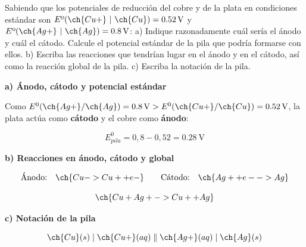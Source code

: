 \begin{exerciseEVAU}
    Sabiendo que los potenciales de reducción del cobre y de la plata en condiciones estándar son \( E\text{º}(\ch{Cu+}\ | \ \ch{Cu}) = \SI{+0.52}{\volt} \)  y \( E\text{º}(\ch{Ag+}\ | \ \ch{Ag}) = \SI{+0.8}{\volt} \): a) Indique razonadamente cuál sería el ánodo y cuál el cátodo. Calcule el potencial estándar de la pila que podría formarse con ellos. b) Escriba las reacciones que tendrían lugar en el ánodo y en el cátodo, así como la reacción global de la pila. c) Escriba la notación de la pila.

    \begin{solu}


        \textbf{a) Ánodo, cátodo y potencial estándar}

        Como \(E^0(\ch{Ag+}/\ch{Ag}) = \SI{0.8}{\volt} > E^0(\ch{Cu+}/\ch{Cu}) = \SI{0.52}{\volt}\), la plata actúa como \textbf{cátodo} y el cobre como \textbf{ánodo}:

        \begin{equation*}
            E^0_{pila} = 0,8-0,52 = \SI{0.28}{\volt}
        \end{equation*}

        \textbf{b) Reacciones en ánodo, cátodo y global}

        \begin{equation*}
            \text{Ánodo:} \quad \ch{Cu -> Cu+ + e-} \qquad \text{Cátodo:} \quad \ch{Ag+ + e- -> Ag}
        \end{equation*}

        \begin{equation*}
            \ch{Cu + Ag+ -> Cu+ + Ag}
        \end{equation*}

        \textbf{c) Notación de la pila}

        \begin{equation*}
            \ch{Cu}(s) \mid \ch{Cu+}(aq) \parallel \ch{Ag+}(aq) \mid \ch{Ag}(s)
        \end{equation*}

    \end{solu}
\end{exerciseEVAU}

